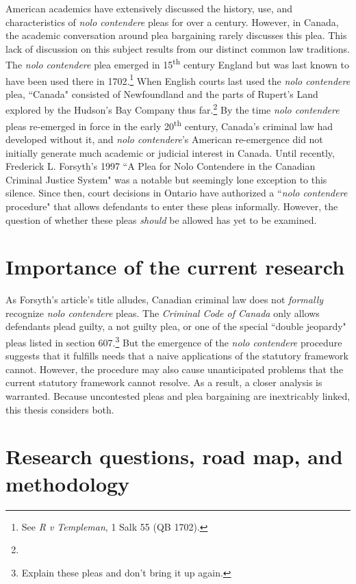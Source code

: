 American academics have extensively discussed the history, use, and characteristics of \textit{nolo contendere} pleas for over a century. However, in Canada, the academic conversation around plea bargaining rarely discusses this plea. This lack of discussion on this subject results from our distinct common law traditions. The \textit{nolo contendere} plea emerged in 15\textsuperscript{th} century England but was last known to have been used there in 1702.\footnote{See \textit{R v Templeman}, 1 Salk 55 (QB 1702).} When English courts last used the \textit{nolo contendere} plea, ``Canada" consisted of Newfoundland and the parts of Rupert's Land explored by the Hudson's Bay Company thus far.\footnote{} By the time \textit{nolo contendere} pleas re-emerged in force in the early 20\textsuperscript{th} century, Canada's criminal law had developed without it, and \textit{nolo contendere}'s American re-emergence did not initially generate much academic or judicial interest in Canada. Until recently, Frederick L. Forsyth's 1997 ``A Plea for Nolo Contendere in the Canadian Criminal Justice System" was a notable but seemingly lone exception to this silence. Since then, court decisions in Ontario have authorized a ``\textit{nolo contendere} procedure" that allows defendants to enter these pleas informally. However, the question of whether these pleas \textit{should} be allowed has yet to be examined. 

\section{Importance of the current research}

As Forsyth's article's title alludes, Canadian criminal law does not \textit{formally} recognize \textit{nolo contendere} pleas. The \textit{Criminal Code of Canada} only allows defendants plead guilty, a not guilty plea, or one of the special ``double jeopardy" pleas listed in section 607.\footnote{Explain these pleas and don't bring it up again.} But the emergence of the \textit{nolo contendere} procedure suggests that it fulfills needs that a naive applications of the statutory framework cannot. However, the procedure may also cause unanticipated problems that the current statutory framework cannot resolve. As a result, a closer analysis is warranted. Because uncontested pleas and plea bargaining are inextricably linked, this thesis considers both.

\section{Research questions, road map, and methodology}

